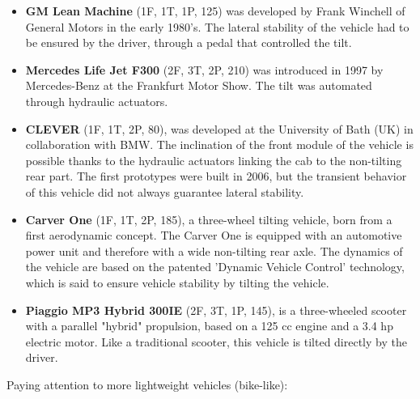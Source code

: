 \begin{itemize}
	\begin{itemize}
	\item \textbf{GM Lean Machine}\cite{leanmachine} (1F, 1T, 1P, 125) was developed by Frank Winchell of General Motors in the early 1980's. The lateral stability of the vehicle had to be ensured by the driver, through a pedal that controlled the tilt. 

	\item \textbf{Mercedes Life Jet F300}\cite{f300} (2F, 3T, 2P, 210) was introduced in 1997 by Mercedes-Benz at the Frankfurt Motor Show. The tilt was automated through hydraulic actuators. 
	
	\item \textbf{CLEVER}\cite{clever} (1F, 1T, 2P, 80), was developed at the University of Bath (UK) in collaboration with BMW. The inclination of the front module of the vehicle is possible thanks to the hydraulic actuators linking the cab to the non-tilting rear part. The first prototypes were built in 2006, but the transient behavior of this vehicle did not always guarantee lateral stability.
	
	\item \textbf{Carver One}\cite{ClassAvec04} (1F, 1T, 2P, 185), a three-wheel tilting vehicle, born from a first aerodynamic concept. The Carver One is equipped with an automotive power unit and therefore with a wide non-tilting rear axle. The dynamics of the vehicle are based on the patented 'Dynamic Vehicle Control' technology, which is said to ensure vehicle stability by tilting the vehicle. 
	
	\item \textbf{Piaggio MP3 Hybrid 300IE}\cite{piaggio} (2F, 3T, 1P, 145), is a three-wheeled scooter with a parallel "hybrid" propulsion, based on a 125 cc engine and a 3.4 hp electric motor. Like a traditional scooter, this vehicle is tilted directly by the driver. 
		\end{itemize}
\end{itemize}

Paying attention to more lightweight vehicles (bike-like):
	
